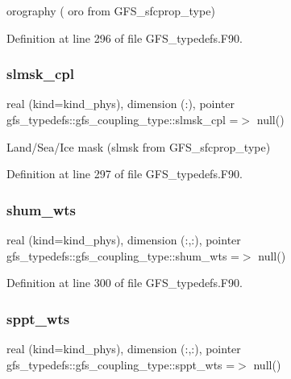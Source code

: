 orography ( oro from G\+F\+S\+\_\+sfcprop\+\_\+type) 



Definition at line 296 of file G\+F\+S\+\_\+typedefs.\+F90.

\mbox{\label{structgfs__typedefs_1_1gfs__coupling__type_a56d222e615093775982557f1a6e22f1a}} 
\subsubsection{slmsk\+\_\+cpl}
{\footnotesize\ttfamily real (kind=kind\+\_\+phys), dimension  (\+:), pointer gfs\+\_\+typedefs\+::gfs\+\_\+coupling\+\_\+type\+::slmsk\+\_\+cpl =$>$ null()}



Land/\+Sea/\+Ice mask (slmsk from G\+F\+S\+\_\+sfcprop\+\_\+type) 



Definition at line 297 of file G\+F\+S\+\_\+typedefs.\+F90.

\mbox{\label{structgfs__typedefs_1_1gfs__coupling__type_a092ee9e76d7db715421c10368638a9c1}} 
\subsubsection{shum\+\_\+wts}
{\footnotesize\ttfamily real (kind=kind\+\_\+phys), dimension  (\+:,\+:), pointer gfs\+\_\+typedefs\+::gfs\+\_\+coupling\+\_\+type\+::shum\+\_\+wts =$>$ null()}



Definition at line 300 of file G\+F\+S\+\_\+typedefs.\+F90.

\mbox{\label{structgfs__typedefs_1_1gfs__coupling__type_af2f7511d0c6fec71e88b28715f6dc84f}} 
\subsubsection{sppt\+\_\+wts}
{\footnotesize\ttfamily real (kind=kind\+\_\+phys), dimension  (\+:,\+:), pointer gfs\+\_\+typedefs\+::gfs\+\_\+coupling\+\_\+type\+::sppt\+\_\+wts =$>$ null()}



